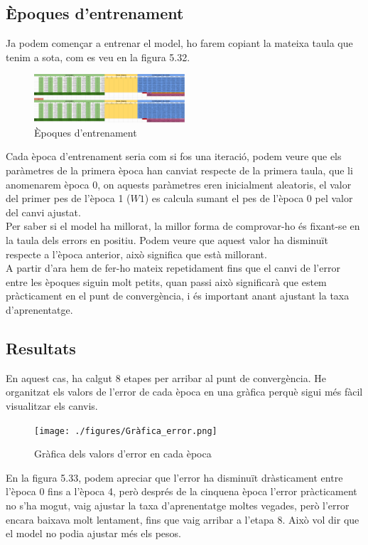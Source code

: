 \subsection{Èpoques d'entrenament}
Ja podem començar a entrenar el model, ho farem copiant la mateixa taula que tenim a sota, com es veu en la figura 5.32.

\begin{figure}[H]
    \centering
    \includegraphics[width=0.5\textwidth]{./figures/Etapa_1.png}
    \caption{Èpoques d'entrenament}
\end{figure}

Cada època d'entrenament seria com si fos una iteració, podem veure que els paràmetres de la primera època han canviat respecte de la primera taula, que li anomenarem època 0, on aquests paràmetres eren inicialment aleatoris, el valor del primer pes de l'època 1 ($W1$) es calcula sumant el pes de l'època 0 pel valor del canvi ajustat.\\
Per saber si el model ha millorat, la millor forma de comprovar-ho és fixant-se en la taula dels errors en positiu. Podem veure que aquest valor ha disminuït respecte a l'època anterior, això significa que està millorant.\\
A partir d'ara hem de fer-ho mateix repetidament fins que el canvi de l'error entre les èpoques siguin molt petits, quan passi això significarà que estem pràcticament en el punt de convergència, i és important anant ajustant la taxa d'aprenentatge.
\subsection{Resultats}
En aquest cas, ha calgut 8 etapes per arribar al punt de convergència. He organitzat els valors de l'error de cada època en una gràfica perquè sigui més fàcil visualitzar els canvis.


\begin{figure}[H]
    \centering
    \texttt{[image: ./figures/Gràfica\_error.png]}
    \caption{Gràfica dels valors d'error en cada època}
\end{figure}


En la figura 5.33, podem apreciar que l'error ha disminuït dràsticament entre l'època 0 fins a l'època 4, però després de la cinquena època l'error pràcticament no s'ha mogut, vaig ajustar la taxa d'aprenentatge moltes vegades, però l'error encara baixava molt lentament, fins que vaig arribar a l'etapa 8. Això vol dir que el model no podia ajustar més els pesos.


